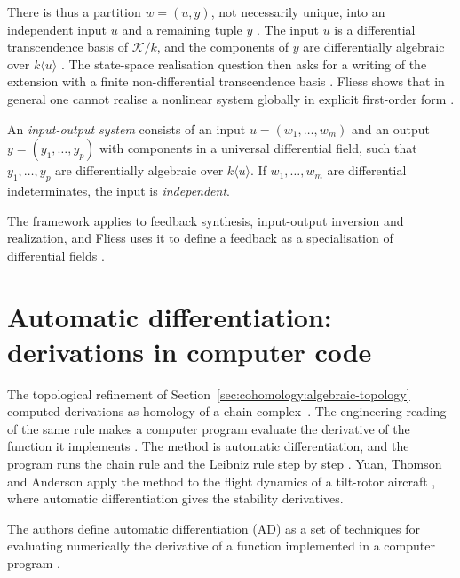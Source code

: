 There is thus a partition $w=(u,y)$, not necessarily unique, into an
independent input $u$ and a remaining tuple $y$ \cite[\S1.2,
p.~228]{Fliess1989}. The input $u$ is a differential transcendence basis of
$\mathcal{K}/k$, and the components of $y$ are differentially algebraic over
$k\langle u\rangle$ \cite[\S1.2, p.~228]{Fliess1989}. The state-space
realisation question then asks for a writing of the extension with a finite
non-differential transcendence basis \cite[\S1.2, p.~228]{Fliess1989}. Fliess
shows that in general one cannot realise a nonlinear system globally in
explicit first-order form \cite[Introduction, p.~227]{Fliess1989}.

\begin{definition}\label{def:diffalg:io-system}
An \emph{input-output system} consists of an input $u=(w_1,\ldots,w_m)$ and an
output $y=(y_1,\ldots,y_p)$ with components in a universal differential field,
such that $y_1,\ldots,y_p$ are differentially algebraic over $k\langle u\rangle$.
If $w_1,\ldots,w_m$ are differential indeterminates, the input is
\emph{independent}.
\end{definition}

The framework applies to feedback synthesis, input-output inversion and
realization, and Fliess uses it to define a feedback as a specialisation of
differential fields \cite[Introduction, p.~227]{Fliess1989}.

\section{Automatic differentiation: derivations in computer code}\label{sec:differential-algebra:automatic-differentiation}

The topological refinement of Section~\ref{sec:cohomology:algebraic-topology}
computed derivations as homology of a chain complex~\cite{YuanThomsonAnderson2020}. The engineering reading
of the same rule makes a computer program evaluate the derivative of the
function it implements \cite[Introduction, p.~2]{YuanThomsonAnderson2020}.
The method is automatic differentiation, and the program runs the chain rule
and the Leibniz rule step by step \cite{YuanThomsonAnderson2020}.
Yuan, Thomson and Anderson apply the method to the flight dynamics of a
tilt-rotor aircraft \cite{YuanThomsonAnderson2020}, where automatic
differentiation gives the stability derivatives.

The authors define automatic differentiation (AD) as a set of techniques for
evaluating numerically the derivative of a function implemented in a computer
program \cite[Introduction, p.~2]{YuanThomsonAnderson2020}.

